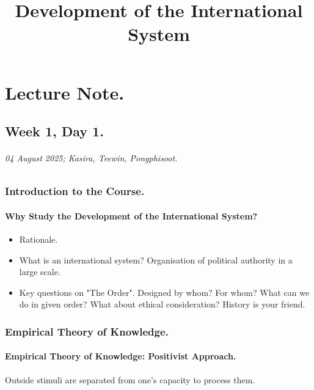 \documentclass[11pt]{book}
\title{Development of the International System}
\begin{document}
\maketitle
\tableofcontents
\part{Lecture Note.}
	\chapter{Week 1, Day 1.}
			\paragraph{04 August 2025; Kasira, Teewin, Pongphisoot.}
		\section{Introduction to the Course.}
			\subsection{Why Study the Development of the International System?}
				\begin{itemize}
					\item Rationale.
					\item What is an international system?
						\subitem Organisation of political authority in a large scale.
					\item Key questions on "The Order".
						\subitem Designed by whom? For whom? What can we do in given order?
						\subitem What about ethical consideration?
						\subitem History is your friend.
				\end{itemize}
				
				
		\section{Empirical Theory of Knowledge.}
					\subsection{Empirical Theory of Knowledge: Positivist Approach.}
					Outside stimuli are separated from one's capacity to process them.
\end{document}

